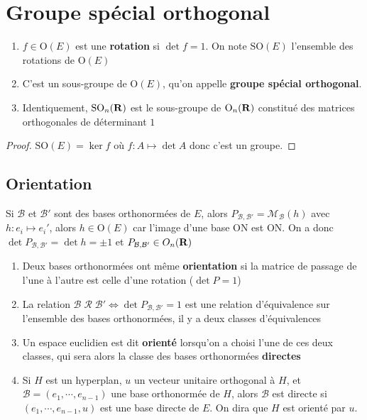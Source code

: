 \section{Groupe spécial orthogonal}

\begin{thmdef}
    \begin{enumerate}
        \item $f \in  \mathrm  O(E)$ est une \textbf{rotation} si $\det f=1$. On note  $\mathrm {SO}(E)$ l'ensemble des rotations de $\mathrm  O(E)$
        \item C'est un sous-groupe de $\mathrm O(E)$, qu'on appelle \textbf{groupe spécial orthogonal}.
        \item Identiquement, $\mathrm {SO}_n(\mathbf R)$ est le sous-groupe de $\mathrm  O_n(\mathbf R)$ constitué des matrices orthogonales de déterminant $1$
    \end{enumerate}
\end{thmdef}

\begin{proof}
    $\mathrm  {SO}(E)=\ker f$ où $f:A\longmapsto \det A$ donc c'est un groupe.
\end{proof}

\subsection{Orientation}

Si $\mathcal  B$ et $\mathcal B'$ sont des bases orthonormées de $E$, alors  $P_{\mathcal  B, \mathcal  B'}=\mathcal M_{\mathcal  B}(h)$ avec $h:e_i\longmapsto e_i'$, alors $h \in  \mathrm O(E)$ car l'image d'une base ON est ON. On a donc $\det P_{\mathcal  B, \mathcal  B'}=\det h=\pm1$ et $P_{\mathcal  B, \mathcal  B'} \in  O_n(\mathbf R)$

\begin{dfn}
\begin{enumerate}
    \item Deux bases orthonormées ont même \textbf{orientation} si la matrice de passage de l'une à l'autre est celle d'une rotation ($\det P=1$)
    \item La relation $\mathcal  B \; \mathcal  R\; \mathcal  B' \iff  \det P_{\mathcal  B, \mathcal B'}=1$ est une relation d'équivalence sur l'ensemble des bases orthonormées, il y a deux classes d'équivalences
    \item Un espace euclidien est dit \textbf{orienté} lorsqu'on a choisi l'une de ces deux classes, qui sera alors la classe des bases orthonormées \textbf{directes} 
    \item Si $H$ est un hyperplan,  $u$ un vecteur unitaire orthogonal à  $H$, et  $\mathcal  B=(e_1, \cdots , e_{n-1})$ une base orthonormée de $H$, alors $\mathcal  B$ est directe si $(e_1, \cdots , e_{n-1}, u)$ est une base directe de $E$. On dira que  $H$ est orienté par  $u$.
\end{enumerate}
\end{dfn}

